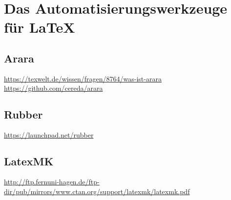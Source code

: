 \chapter{Das Automatisierungswerkzeuge für \LaTeX}

\section{Arara}
\url{https://texwelt.de/wissen/fragen/8764/was-ist-arara}
\url{https://github.com/cereda/arara}
\section{Rubber}
\url{https://launchpad.net/rubber}
\section{LatexMK}
\url{http://ftp.fernuni-hagen.de/ftp-dir/pub/mirrors/www.ctan.org/support/latexmk/latexmk.pdf}
